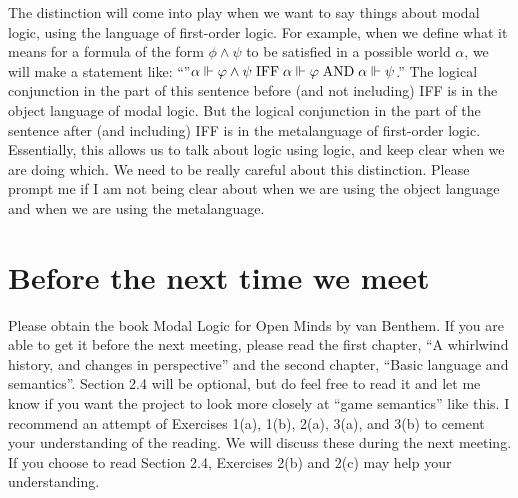 The distinction will come into play when we want to say things about modal logic, using the language of first-order logic. 
For example, when we define what it means for a formula of the form $\phi \wedge \psi$ to be satisfied in a possible world 
$\alpha$, we will make a statement like: ``''$\alpha \Vdash \varphi \wedge \psi \mathord{\;\mathrm{IFF}\;} \alpha \Vdash \varphi \mathord{\;\mathrm{AND}\;} \alpha \Vdash \psi$.''
The logical conjunction in the part of this sentence before (and not including) IFF is in the object 
language of modal logic. But the logical conjunction in the part of the sentence after (and including) IFF 
is in the metalanguage of first-order logic. Essentially, this allows us to talk about logic using logic, and keep clear when we are doing which. 
We need to be really careful about this distinction. Please prompt me if I am not being clear about when we 
are using the object language and when we are using the metalanguage.

\section{Before the next time we meet}
Please obtain the book Modal Logic for Open Minds by van Benthem. 
If you are able to get it before the next meeting, please read the first chapter, 
``A whirlwind history, and changes in perspective'' and the second chapter, ``Basic language and semantics''. 
Section 2.4 will be optional, but do feel free to read it and let me know if you want the project to look more closely at 
``game semantics'' like this. I recommend an attempt of Exercises 1(a), 1(b), 2(a), 3(a), and 3(b) 
to cement your understanding of the reading. We will discuss these during the next meeting. 
If you choose to read Section 2.4, Exercises 2(b) and 2(c) may help your understanding.


